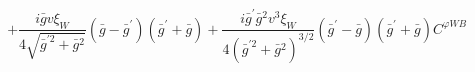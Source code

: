 %
\begin{dmath*}
%
  +  \frac{i {\bar g}{} v \xi_W}{4 \sqrt{{\bar g}^{\prime 2} + {\bar g}{}^2}}({\bar g}{} - {\bar g}^\prime) ({\bar g}^\prime + {\bar g}{})  +  \frac{i {\bar g}^\prime {\bar g}{}^2 v^3 \xi_W}{4 \left({\bar g}^{\prime 2} + {\bar g}{}^2\right)^{3/2}}({\bar g}^\prime - {\bar g}{}) ({\bar g}^\prime + {\bar g}{}) C^{ \varphi  WB}
%
\end{dmath*}
%
